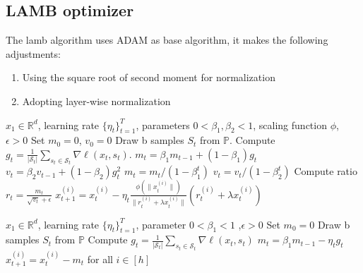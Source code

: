 \subsection*{LAMB optimizer}
The lamb algorithm uses ADAM as base algorithm, it makes the following adjustments:
\begin{enumerate}
    \item Using the square root of second moment for normalization
    \item Adopting layer-wise normalization
\end{enumerate}
\begin{minipage}[b]{.5\textwidth}
\begin{algorithm}[H]\small
	\caption{$LAMB$}
	\label{alg:lamb}
	\begin{algorithmic}
		 $x_1 \in \mathbb{R}^d$, learning rate $\{\eta_t\}_{t=1}^T$,  parameters $0 < \beta_{1}, \beta_2 < 1$, scaling function $\phi$, $\epsilon > 0$
		\STATE Set $m_{0} = 0$, $v_{0} = 0$
		\STATE Draw b samples $S_t$ from $\mathbb{P}$.
        \STATE Compute $g_t = \frac{1}{|\mathcal{S}_t|} \sum_{s_t \in \mathcal{S}_t}\nabla \ell(x_t, s_t)$.
		\STATE  $m_{t} = \beta_{1} m_{t-1} + (1 - \beta_{1}) g_{t}$ 
		\STATE  $v_{t} = \beta_{2} v_{t-1} + (1 - \beta_{2}) g_{t}^2$
		\STATE $m_t = m_t/(1 - {\beta}_1^t)$ 
        \STATE $v_t = v_t/(1 - {\beta}_2^t)$
		\STATE Compute ratio $r_t = \frac{m_t}{\sqrt{v_t} + \epsilon}$
		\STATE $x_{t+1}^{(i)} = x_{t}^{(i)} - \eta_t \frac{\phi(\|x_t^{(i)}\|)}{\|r_t^{(i)} + \lambda x_t^{(i)}\|} (r_t^{(i)} + \lambda x_t^{(i)})$
		\ENDFOR
	\end{algorithmic}
\end{algorithm}
\end{minipage}

\begin{minipage}[b]{.48\textwidth}
\begin{algorithm}[H]\small
	\caption{$Momentum\:SGD$}
	\label{alg:SGD}
	\begin{algorithmic}
		 $x_1 \in \mathbb{R}^d$, learning rate $\{\eta_t\}_{t=1}^T$, parameter $0 < \beta_{1} < 1$ ,$\epsilon > 0$
		\STATE Set $m_{0} = 0$
		\FOR{$t=1$ {\bfseries to} $T$}
		\STATE Draw b samples $S_t$ from $\mathbb{P}$
        \STATE Compute $g_t = \frac{1}{|\mathcal{S}_t|} \sum_{s_t \in \mathcal{S}_t}\nabla \ell(x_t, s_t)$
        \STATE $m_t = \beta_1 m_{t-1} - \eta_t g_t$
		\STATE $x_{t+1}^{(i)} = x_{t}^{(i)} - m_t$ for all $i \in [h]$
		\ENDFOR
	\end{algorithmic}
\end{algorithm}
\end{minipage}\hfill%

